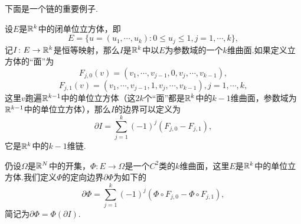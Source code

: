 下面是一个链的重要例子.

设$E$是$\mathbb R^k$中的闭单位立方体，即
\[E=\{u=(u_1,\cdots,u_k)\colon 0\le u_j\le 1,j=1,\cdots,k\},\]
记$I\colon E\to\mathbb R^k$是恒等映射，那么$I$是$\mathbb R^k$中以$E$为参数域的一个$k$维曲面.如果定义立方体的“面”为
\[F_{j,0}(v)=(v_1,\cdots,v_{j-1},0,v_j,\cdots,v_{k-1}),\]
\[F_{j,1}(v)=(v_1,\cdots,v_{j-1},1,v_j,\cdots,v_{k-1}),j=1,\cdots,k,\]
这里$v$跑遍$\mathbb R^{k-1}$中的单位立方体（这$2k$个“面”都是$\mathbb R^k$中的$k-1$维曲面，参数域为$\mathbb R^{k-1}$中的单位立方体），那么$I$的边界可以定义为
\begin{equation}\label{eq4.5.7}
	\partial I=\sum_{j=1}^{k}(-1)^j(F_{j,0}-F_{j,1}),
\end{equation}
它是$\mathbb R^k$中的$k-1$维链.

仍设$\Omega$是$\mathbb R^N$中的开集，$\Phi\colon E\to\Omega$是一个$C^2$类的$k$维曲面，这里$E$是$\mathbb R^k$中的单位立方体.我们定义$\Phi$的定向边界$\partial\Phi$为如下的
\begin{equation}\label{eq4.5.8}
	\partial\Phi=\sum_{j=1}^{k}(-1)^j(\Phi\circ F_{j,0}-\Phi\circ F_{j,1}),
\end{equation}
简记为$\partial\Phi=\Phi(\partial I)$.

